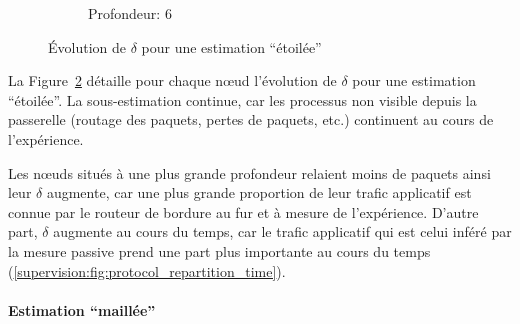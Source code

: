 \begin{figure}[h]
\begin{subfigure}{0.3\textwidth}
    \caption{Profondeur: 6}
    \label{supervision:fig:noinfo_6}
  \end{subfigure}
  \caption{Évolution de $\delta$ pour une estimation ``étoilée''}
  \label{supervision:fig:noinfo}
\end{figure}

La Figure~\ref{supervision:fig:noinfo} détaille pour chaque nœud l'évolution de $\delta$ pour une estimation ``étoilée''.
La sous-estimation continue, car les processus non visible depuis la passerelle (routage des paquets, pertes de paquets, etc.) continuent au cours de l'expérience.

Les nœuds situés à une plus grande profondeur relaient moins de paquets ainsi leur $\delta$ augmente, car une plus grande proportion de leur trafic applicatif est connue par le routeur de bordure au fur et à mesure de l'expérience.
D'autre part, $\delta$ augmente au cours du temps, car le trafic applicatif qui est celui inféré par la mesure passive prend une part plus importante au cours du temps (\ref{supervision:fig:protocol_repartition_time}).

\paragraph{Estimation ``maillée''}

